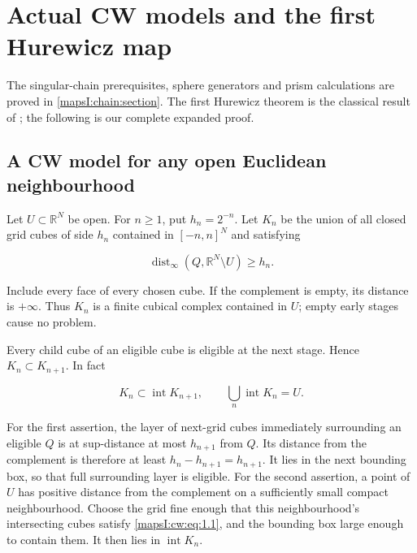 \section{Actual CW models and the first Hurewicz map}
\label{mapsI:cw:section}

The singular-chain prerequisites, sphere generators and prism calculations are proved in \cref{mapsI:chain:section}. The first Hurewicz theorem is the classical result of \cite[Theorem~4.32]{Hatcher2002}; the following is our complete expanded proof.

\subsection{A CW model for any open Euclidean neighbourhood}
\label{mapsI:cw:cw-open}

Let \(U\subset\mathbb R^N\) be open. For \(n\geq1\), put \(h_n=2^{-n}\). Let \(K_n\) be the union of all closed grid cubes of side \(h_n\) contained in \([-n,n]^N\) and satisfying

\begin{equation}
\operatorname{dist}_{\infty}(Q,\mathbb R^N\setminus U)\geq h_n.
\label{mapsI:cw:eq:1.1}
\end{equation}

Include every face of every chosen cube. If the complement is empty, its distance is \(+\infty\). Thus \(K_n\) is a finite cubical complex contained in \(U\); empty early stages cause no problem.

Every child cube of an eligible cube is eligible at the next stage. Hence \(K_n\subset K_{n+1}\). In fact

\begin{equation}
K_n\subset\operatorname{int}K_{n+1},
\qquad
\bigcup_n\operatorname{int}K_n=U.
\label{mapsI:cw:eq:1.2}
\end{equation}

For the first assertion, the layer of next-grid cubes immediately surrounding an eligible \(Q\) is at sup-distance at most \(h_{n+1}\) from \(Q\). Its distance from the complement is therefore at least \(h_n-h_{n+1}=h_{n+1}\). It lies in the next bounding box, so that full surrounding layer is eligible. For the second assertion, a point of \(U\) has positive distance from the complement on a sufficiently small compact neighbourhood. Choose the grid fine enough that this neighbourhood's intersecting cubes satisfy \eqref{mapsI:cw:eq:1.1}, and the bounding box large enough to contain them. It then lies in \(\operatorname{int}K_n\).

